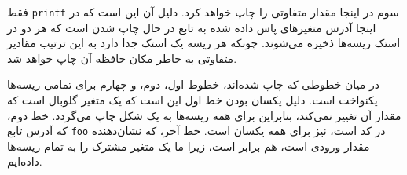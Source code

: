 فقط
\verb|printf|
سوم در اینجا مقدار متفاوتی را چاپ خواهد کرد. دلیل آن این است که در اینجا آدرس متغیرهای پاس داده شده به تابع در حال چاپ شدن است که هر دو در استک ریسه‌ها ذخیره می‌شوند. چونکه هر ریسه یک استک جدا دارد به این ترتیب مقادیر متفاوتی به خاطر مکان حافظه آن چاپ خواهد شد.

در میان خطوطی که چاپ شده‌اند، خطوط اول، دوم، و چهارم برای تمامی ریسه‌ها یکنواخت است. دلیل یکسان بودن خط اول این است که یک متغیر گلوبال است که مقدار آن تغییر نمی‌کند، بنابراین برای همه ریسه‌ها به یک شکل چاپ می‌گردد. خط دوم، که آدرس تابع \verb|foo| در کد است، نیز برای همه یکسان است. خط آخر، که نشان‌دهنده مقدار ورودی است، هم برابر است، زیرا ما یک متغیر مشترک را به تمام ریسه‌ها داده‌ایم.